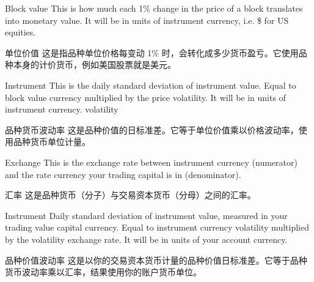 \bipairgap

\begin{englishblock} Block value This is how much each 1\% change in the price of a block translates into monetary value. It will be in units of instrument currency, i.e. \$ for US equities. \end{englishblock}

\begin{chineseblock}单位价值 这是指品种单位价格每变动 1\% 时，会转化成多少货币盈亏。它使用品种本身的计价货币，例如美国股票就是美元。\end{chineseblock}

\bipairgap

\begin{englishblock} Instrument This is the daily standard deviation of instrument value. Equal to block value currency multiplied by the price volatility. It will be in units of instrument currency. volatility \end{englishblock}

\begin{chineseblock}品种货币波动率 这是品种价值的日标准差。它等于单位价值乘以价格波动率，使用品种货币单位计量。\end{chineseblock}

\bipairgap

\begin{englishblock} Exchange This is the exchange rate between instrument currency (numerator) and the rate currency your trading capital is in (denominator). \end{englishblock}

\begin{chineseblock}汇率 这是品种货币（分子）与交易资本货币（分母）之间的汇率。\end{chineseblock}

\bipairgap

\begin{englishblock} Instrument Daily standard deviation of instrument value, measured in your trading value capital currency. Equal to instrument currency volatility multiplied by the volatility exchange rate. It will be in units of your account currency. \end{englishblock}

\begin{chineseblock}品种价值波动率 这是以你的交易资本货币计量的品种价值日标准差。它等于品种货币波动率乘以汇率，结果使用你的账户货币单位。\end{chineseblock}

